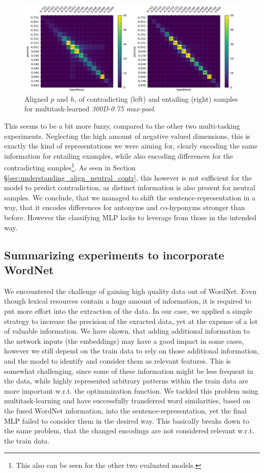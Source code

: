 \begin{figure}[tph!]
\centering
	\includegraphics[totalheight=7cm]{fig/masking_e_c.png}
	\caption{Aligned $p$ and $h$, of contradicting (left) and entailing (right) samples for multitask-learned \textit{300D-0.75 max-pool}.}
	\label{fig:masking_e_c}
\end{figure}
This seems to be a bit more fuzzy, compared to the other two multi-tasking experiments. Neglecting the high amount of negative valued dimensions, this is exactly the kind of representations we were aiming for, clearly encoding the same information for entailing examples, while also encoding differences for the contradicting samples\footnote{This also can be seen for the other two evaluated models.}. As seen in Section §\ref{sec:understanding_align_neutral_contr}, this however is not sufficient for the model to predict contradiction, as distinct information is also present for neutral samples. We conclude, that we managed to shift the sentence-representation in a way, that it encodes differences for antonyms and co-hyponyms stronger than before. However the classifying \ac{MLP} lacks to leverage from those in the intended way. 
\subsection{Summarizing experiments to incorporate WordNet}
We encountered the challenge of gaining high quality data out of WordNet. Even though lexical resources contain a huge amount of information, it is required to put more effort into the extraction of the data. In our case, we applied a simple strategy to increase the precision of the exracted data, yet at the expense of a lot of valuable information. We have shown, that adding additional information to the network inputs (the embeddings) may have a good impact in some cases, however we still depend on the train data to rely on those additional information, and the model to identify and consider them as relevant features. This is somewhat challenging, since some of these information might be less frequent in the data, while highly represented arbitrary patterns within the train data are more important w.r.t. the optimmization function. We tackled this problem using multitask-learning and have successfully transferred word similarities, based on the fused WordNet information, into the sentence-representation, yet the final \ac{MLP} failed to consider them in the desired way. This basically breaks down to the same problem, that the changed encodings are not considered relevant w.r.t. the train data.
